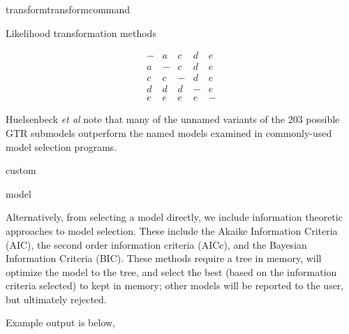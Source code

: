 \begin{command}{transform}{transformcommand}
\begin{arguments}
\begin{argumentgroup}{Likelihood transformation methods}
{\begin{description}
{                        \begin{equation*}
                            \begin{array}{ccccc}
                                - & a & c & d & e \\
                                a & - & c & d & e \\
                                c & c & - & d & e \\
                                d & d & d & - & e \\
                                e & e & e & e & -
                             \end{array}
                        \end{equation*}

                        Huelsenbeck \emph{et al} \cite{huelsenbeck2004bayesian}
                        note that many of the unnamed variants of the 203
                        possible GTR submodels outperform the named models
                        examined in commonly-used model selection programs.}
                        {custom}

                \end{description}}
            {model}
            
                { Alternatively, from selecting a model directly, we include
                information theoretic approaches to model selection. These
                include the Akaike Information Criteria (AIC), the second order
                information criteria (AICc), and the Bayesian Information
                Criteria (BIC). These methods require a tree in memory, will
                optimize the model to the tree, and select the best (based on
                the information criteria selected) to kept in memory; other
                models will be reported to the user, but ultimately rejected.

                Example output is below,
                
}
\end{argumentgroup}
\end{arguments}
\end{command}
